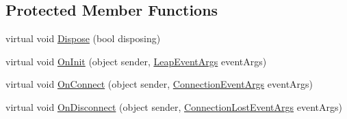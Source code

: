 \subsection*{Protected Member Functions}
\begin{DoxyCompactItemize}
\item 
virtual void \mbox{\hyperlink{class_leap_1_1_controller_a491436d5722a11b55596f2f14434098b}{Dispose}} (bool disposing)
\item 
virtual void \mbox{\hyperlink{class_leap_1_1_controller_a0e0ce4c3c7526305c2a8c79c7f5cd1a7}{On\+Init}} (object sender, \mbox{\hyperlink{class_leap_1_1_leap_event_args}{Leap\+Event\+Args}} event\+Args)
\item 
virtual void \mbox{\hyperlink{class_leap_1_1_controller_afb73429c5375282477149dfbb9cc698f}{On\+Connect}} (object sender, \mbox{\hyperlink{class_leap_1_1_connection_event_args}{Connection\+Event\+Args}} event\+Args)
\item 
virtual void \mbox{\hyperlink{class_leap_1_1_controller_a06fff0c5313c992da0b84714f561acff}{On\+Disconnect}} (object sender, \mbox{\hyperlink{class_leap_1_1_connection_lost_event_args}{Connection\+Lost\+Event\+Args}} event\+Args)
\end{DoxyCompactItemize}
